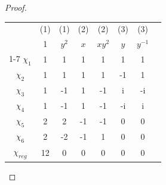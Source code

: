 \documentclass{article}
\begin{document}
\begin{proof}
    
    \begin{tabular}{c | c c c c c c c }
        & (1) & (1) & (2) & (2) & (3) & (3)  \\
        & 1 & $y^2$ & $x$  & $xy^2$ & $y$  & $y^{-1}$ \\
        \cline{1-7}
        $\chi_{1}$ & 1 & 1 & 1 & 1 & 1 & 1 \\
        $\chi_{2}$ & 1 & 1 & 1 & 1 & -1 & 1 \\
        $\chi_{3}$ & 1 & -1 & 1 & -1 & i & -i \\
        $\chi_{4}$ & 1 & -1 & 1 & -1 & -i & i \\



        $\chi_{5}$ & 2 & 2 & -1 & -1  & 0 & 0  \\
        $\chi_{6}$ & 2 & -2 & -1 & 1 & 0 & 0 \\
        $\chi_{reg}$ & 12 & 0 & 0 & 0 &0 & 0  
    \end{tabular}
\end{proof}
\end{document}
